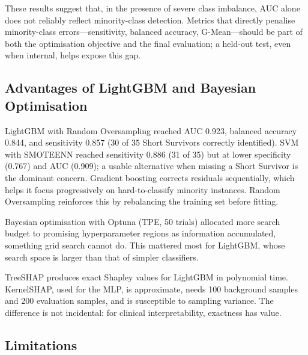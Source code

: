 \documentclass[preprint,12pt]{elsarticle}
\begin{document}
These results suggest that, in the presence of severe class imbalance, AUC alone
does not reliably reflect minority-class detection. Metrics that directly penalise
minority-class errors---sensitivity, balanced accuracy, G-Mean---should be part
of both the optimisation objective and the final evaluation; a held-out test,
even when internal, helps expose this gap.

\subsection{Advantages of LightGBM and Bayesian Optimisation}

LightGBM with Random Oversampling reached AUC 0.923, balanced accuracy 0.844,
and sensitivity 0.857 (30 of 35 Short Survivors correctly identified).
SVM with SMOTEENN reached sensitivity 0.886 (31 of 35) but at lower specificity
(0.767) and AUC (0.909); a usable alternative when missing a Short Survivor
is the dominant concern. Gradient boosting corrects residuals sequentially,
which helps it focus progressively on hard-to-classify minority instances.
Random Oversampling reinforces this by rebalancing the training set before fitting.

Bayesian optimisation with Optuna (TPE, 50 trials) allocated more search budget
to promising hyperparameter regions as information accumulated, something grid
search cannot do. This mattered most for LightGBM, whose search space is larger
than that of simpler classifiers.

TreeSHAP produces exact Shapley values for LightGBM in polynomial time.
KernelSHAP, used for the MLP, is approximate, needs 100 background samples
and 200 evaluation samples, and is susceptible to sampling variance. The
difference is not incidental: for clinical interpretability, exactness has value.

\subsection{Limitations}
\end{document}
